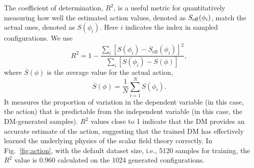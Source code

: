 The coefficient of determination, $R^2$, is a useful metric for quantitatively measuring how well the estimated action values, denoted as $S_{\rm eff}(\phi_i)$,  match the actual ones, denoted as $S(\phi_i)$. Here $i$ indicates the index in sampled configurations. We use
\begin{equation}
  R^2 = 1 - \frac{\sum_i\left[ S(\phi_i) - S_\text{eff}(\phi_i)\right]^2}{\sum_i \left[S(\phi_i) - \overline{S}(\phi)\right]},
\end{equation}
where $\overline{S}(\phi)$ is the average value for the actual action,
\begin{equation}
    \overline{S}(\phi) =\frac{1}{N}\sum_{i=1}^N S(\phi_i).
\end{equation}
It measures the proportion of variation in the dependent variable (in this case, the action) that is predictable from the independent variable (in this case, the DM-generated samples). $R^2$ values close to 1 indicate that the DM provides an accurate estimate of the action, suggesting that the trained DM has effectively learned the underlying physics of the scalar field theory correctly. 
In Fig.~\ref{fig:action}, with the default dataset size, i.e., 5120 samples for training, the $R^2$ value is 0.960 calculated on the 1024 generated configurations. 

